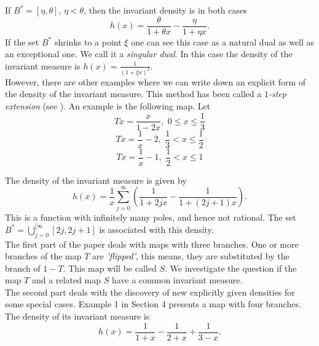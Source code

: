 \documentclass[12pt]{article}
\begin{document}
	If  ${B^{*}} = [\eta, \theta]$, $\eta < \theta$, then the invariant density is in both cases 
	$$ h(x)= \frac{\theta}{1 + \theta x} - \frac{\eta}{1 + \eta x}.$$
	If the set ${B^{*}}$ shrinks to a point $\xi$ one can see this case as a natural dual as well as an exceptional one. We call it a {\em singular dual}. In this case the density of the invariant measure is
	$h(x)= \frac{1}{(1+\xi x)^2}$.\\
	However, there are other examples where we can write down an explicit form of the density of the invariant measure. This method has been called a {\em $1$-step extension} (see \cite{Sch24}). An example is the following map.
	Let 
	$$Tx = \frac{x}{1-2x}, \, \,0 \leq x \leq \frac{1}{3} $$ $$ Tx =  \frac{1}{x} - 2, \, \, \frac{1}{3} < x \leq \frac{1}{2} $$
	$$ Tx = \frac{1}{x} - 1,  \, \,\frac{1}{2} < x \leq 1 $$
	
	The density of the invariant measure is given by
	$$ h(x) = \frac{1}{x} \sum_{j=0}^\infty \left(  \frac{1}{1+2jx}-\frac{1}{1+(2j+1)x} \right). $$
	This is a function with infinitely many poles, and hence not rational.
	The set $B^{*}= \bigcup_{j=0}^{[\infty}[2j, 2j+1]$ is  associated with this density.\\
	The first part of the paper deals with maps with three branches. One or more branches of the map $T$ are {\em 'flipped'}, this means, they are  substituted by the branch of $1 -T$. This map will be called $S$. 	
	We investigate the question if the map $T$ and a related map $S$ have a common invariant measure.\\
	The second part deals with the discovery of new explicitly given densities for some special cases. Example 1 in Section 4 presents a map with four branches. The density of its invariant measure is
	$$h(x)= \frac{1}{1+x} - \frac{1}{2+x} +\frac{1}{3-x}.$$
	
	
\end{document}
